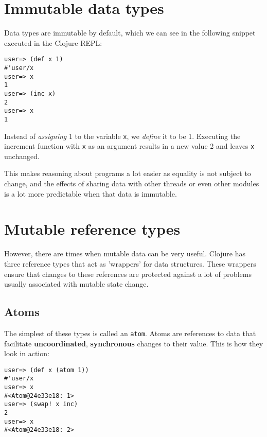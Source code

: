 \documentclass[a4paper,12pt]{kth-mag}
\begin{document}
\section{Immutable data types}

Data types are immutable by default, which we can see in the following snippet executed in the Clojure REPL:

\begin{listing}[H]
	\begin{verbatim}
user=> (def x 1)
#'user/x
user=> x
1
user=> (inc x)
2
user=> x
1
	\end{verbatim}
\end{listing}

Instead of \textit{assigning} 1 to the variable \texttt{x}, we \textit{define} it to be 1. Executing the increment function with \texttt{x} as an argument results in a new value 2 and leaves \texttt{x} unchanged.

This makes reasoning about programs a lot easier as equality is not subject to change, and the effects of sharing data with other threads or even other modules is a lot more predictable when that data is immutable.

\section{Mutable reference types}

However, there are times when mutable data can be very useful. Clojure has three reference types that act as 'wrappers' for data structures. These wrappers ensure that changes to these references are protected against a lot of problems usually associated with mutable state change.

\subsection{Atoms}

The simplest of these types is called an \texttt{atom}. Atoms are references to data that facilitate \textbf{uncoordinated}, \textbf{synchronous} changes to their value. This is how they look in action:

\begin{listing}[H]
	\begin{verbatim}
user=> (def x (atom 1))
#'user/x
user=> x
#<Atom@24e33e18: 1>
user=> (swap! x inc)
2
user=> x
#<Atom@24e33e18: 2>
	\end{verbatim}
\end{listing}
\end{document}
